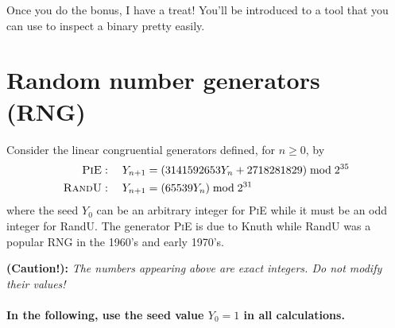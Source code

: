 \documentclass[12pt]{article}
\begin{document}
\noindent Once you do the bonus, I have a treat! You'll be introduced to a tool that you can use to inspect a binary pretty easily.


\section{Random number generators (RNG)}

Consider the linear congruential generators defined, for $n \geq 0$, by
\begin{align*}
    \textsc{PiE} &: \quad Y_{n+1} = (3141592653Y_n + 2718281829) \bmod 2^{35} \\
    \textsc{RandU} &: \quad Y_{n+1} = (65539Y_n) \bmod 2^{31}
\end{align*}
where the seed $Y_0$ can be an arbitrary integer for \textsc{PiE} while it must be an odd integer for RandU. The generator \textsc{PiE} is due to Knuth while RandU was a popular RNG in the 1960's and early 1970's.

\noindent \textbf{(Caution!):} \textit{The numbers appearing above are exact integers. Do not modify their values!}

\paragraph{In the following, use the seed value $Y_0 = 1$ in all calculations.}
\end{document}
